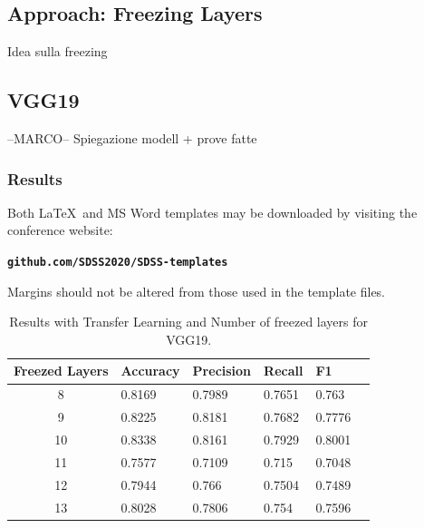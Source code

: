 \documentclass[10pt]{article}
\begin{document}
\subsection{Approach: Freezing Layers}
Idea sulla freezing
\subsection{VGG19}

--MARCO--
Spiegazione modell + prove fatte
\subsubsection{Results}

Both \LaTeX\ and
MS Word templates may be downloaded by visiting the conference website:
\begin{center}
\textbf{\texttt{github.com/SDSS2020/SDSS-templates}}
\end{center}
Margins should not be altered from those used in the template files.

\begin{table}[ht]
\centering
\begin{adjustbox}{width=240}
\small
\begin{tabular}{|c|l|l|l|l|l}

\hline \bf Freezed Layers & \bf Accuracy & \bf Precision & \bf Recall & \bf F1 \\ \hline
8 & 0.8169 & 0.7989 & 0.7651 & 0.763\\
9 & 0.8225 & 0.8181 & 0.7682 & 0.7776\\
10 & 0.8338 & 0.8161 & 0.7929 & 0.8001\\
11 & 0.7577 & 0.7109 & 0.715 & 0.7048\\
12 & 0.7944 & 0.766 & 0.7504 & 0.7489\\
13 & 0.8028 & 0.7806 & 0.754 & 0.7596\\
\hline
\end{tabular}
\end{adjustbox}
\caption{Results with Transfer Learning and Number of freezed layers for VGG19.}
\end{table}
\end{document}
